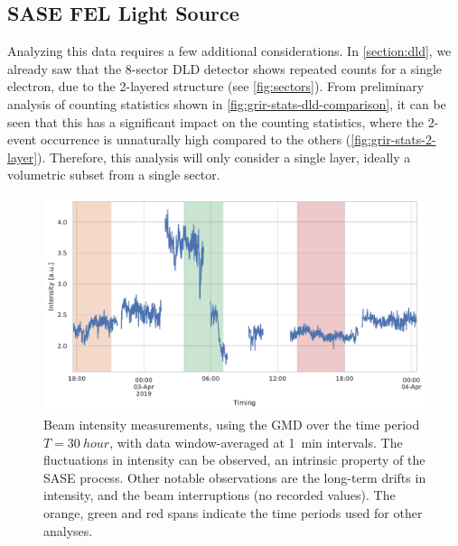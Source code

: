 \subsection*{SASE FEL Light Source}
Analyzing this data requires a few additional considerations. In \cref{section:dld}, we already saw that the \num{8}-sector \gls{DLD} detector shows repeated counts for a single electron, due to the \num{2}-layered structure (see \cref{fig:sectors}). From preliminary analysis of counting statistics shown in \cref{fig:grir-stats-dld-comparison}, it can be seen that this has a significant impact on the counting statistics, where the \num{2}-event occurrence is unnaturally high compared to the others (\cref{fig:grir-stats-2-layer}). Therefore, this analysis will only consider a single layer, ideally a volumetric subset from a single sector.



\begin{figure}
    \centering
    \includegraphics[width=0.8\linewidth]{images/gmd_grir.pdf}
    \caption{Beam intensity measurements, using the \gls{GMD} over the time period $T=\qty{30}{hour}$, with data window-averaged at \qty{1}{min} intervals. The fluctuations in intensity can be observed, an intrinsic property of the \gls{SASE} process. Other notable observations are the long-term drifts in intensity, and the beam interruptions (no recorded values). The orange, green and red spans indicate the time periods used for other analyses.}
    \label{fig:gmd-intensity}
\end{figure}


